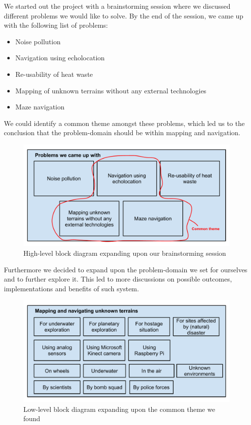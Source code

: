 We started out the project with a brainstorming session where we discussed different problems we would like to solve. By the end of the session, we came up with the following list of problems:
\begin{itemize}
	\item Noise pollution
	\item Navigation using echolocation
	\item Re-usability of heat waste
	\item Mapping of unknown terrains without any external technologies
	\item Maze navigation
\end{itemize}

We could identify a common theme amongst these problems, which led us to the conclusion that the problem-domain should be within mapping and navigation. 

\begin{figure}[!h]
	\centering
	\includegraphics[scale=.7]{images/high-level-block.pdf}
	\caption{High-level block diagram expanding upon our brainstorming session}
	\label{fig:highlevelblock}
\end{figure}

Furthermore we decided to expand upon the problem-domain we set for ourselves and to further explore it. This led to more discussions on possible outcomes, implementations and benefits of such system.

\begin{figure}[!h]
	\centering
	\includegraphics[scale=.7]{images/low-level-block.pdf}
	\caption{Low-level block diagram expanding upon the common theme we found}
	\label{fig:lowlevelblock}
\end{figure}

